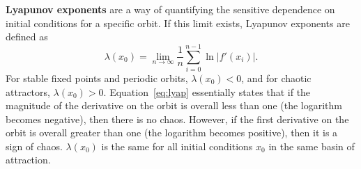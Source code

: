 \textbf{Lyapunov exponents} are a way of quantifying the sensitive
dependence on initial conditions for a specific orbit. If this limit
exists, Lyapunov exponents are defined as 
\begin{equation}\label{eq:lyap}
\lambda(x_0) = \lim_{n \to \infty} \frac{1}{n} \sum_{i=0}^{n-1} \ln |f'(x_i)|.
\end{equation}
For stable fixed points and periodic orbits, $\lambda(x_0) < 0$,
and for chaotic attractors, $\lambda(x_0)>0$. Equation~\ref{eq:lyap} essentially states that if the magnitude of the
derivative on the orbit is overall less than one (the logarithm becomes negative), then there is no chaos. However, if
the first derivative on the orbit is overall greater than one (the logarithm becomes positive), then it is a
sign of chaos. $\lambda(x_0)$ is the same for all initial conditions
$x_0$ in the same basin of attraction. 

